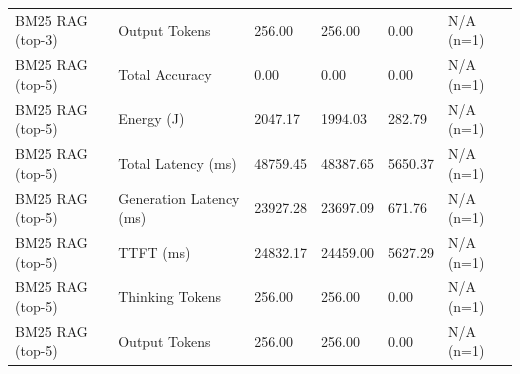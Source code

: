 \begin{table}
\begin{tabular}{llllll}
BM25 RAG (top-3) & Output Tokens & 256.00 & 256.00 & 0.00 & N/A (n=1) \\
BM25 RAG (top-5) & Total Accuracy & 0.00 & 0.00 & 0.00 & N/A (n=1) \\
BM25 RAG (top-5) & Energy (J) & 2047.17 & 1994.03 & 282.79 & N/A (n=1) \\
BM25 RAG (top-5) & Total Latency (ms) & 48759.45 & 48387.65 & 5650.37 & N/A (n=1) \\
BM25 RAG (top-5) & Generation Latency (ms) & 23927.28 & 23697.09 & 671.76 & N/A (n=1) \\
BM25 RAG (top-5) & TTFT (ms) & 24832.17 & 24459.00 & 5627.29 & N/A (n=1) \\
BM25 RAG (top-5) & Thinking Tokens & 256.00 & 256.00 & 0.00 & N/A (n=1) \\
BM25 RAG (top-5) & Output Tokens & 256.00 & 256.00 & 0.00 & N/A (n=1) \\
\bottomrule
\end{tabular}
\end{table}
